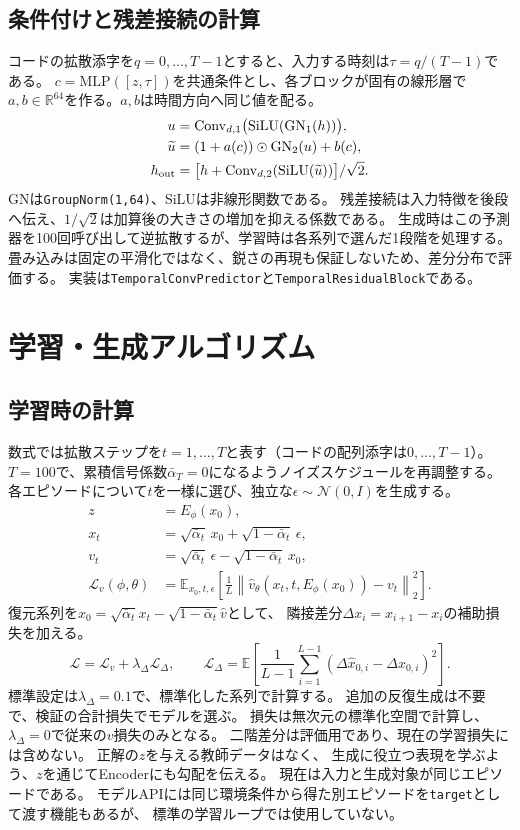 \documentclass[a4paper,10pt]{article}
\begin{document}
\subsection{条件付けと残差接続の計算}
コードの拡散添字を$q=0,\ldots,T-1$とすると、入力する時刻は$\tau=q/(T-1)$である。
$c=\mathrm{MLP}([z,\tau])$を共通条件とし、各ブロックが固有の線形層で
$a,b\in\mathbb R^{64}$を作る。$a,b$は時間方向へ同じ値を配る。
\begin{align*}
 u&=\mathrm{Conv}_{d,1}\bigl(\mathrm{SiLU}(\mathrm{GN}_1(h))\bigr),\\
 \widetilde u&=(1+a(c))\odot\mathrm{GN}_2(u)+b(c),\\
 h_{\rm out}&=\bigl[h+\mathrm{Conv}_{d,2}(\mathrm{SiLU}(\widetilde u))\bigr]/\sqrt{2}.
\end{align*}
GNは\texttt{GroupNorm(1,64)}、SiLUは非線形関数である。
残差接続は入力特徴を後段へ伝え、$1/\sqrt2$は加算後の大きさの増加を抑える係数である。
生成時はこの予測器を100回呼び出して逆拡散するが、学習時は各系列で選んだ1段階を処理する。
畳み込みは固定の平滑化ではなく、鋭さの再現も保証しないため、差分分布で評価する。
実装は\texttt{TemporalConvPredictor}と\texttt{TemporalResidualBlock}である。

\newpage
\section{学習・生成アルゴリズム}
\subsection{学習時の計算}
数式では拡散ステップを$t=1,\ldots,T$と表す（コードの配列添字は$0,\ldots,T-1$）。
$T=100$で、累積信号係数$\bar\alpha_T=0$になるようノイズスケジュールを再調整する。
各エピソードについて$t$を一様に選び、独立な$\epsilon\sim\mathcal{N}(0,I)$を生成する。
\begin{align}
 z&=E_\phi(x_0),\\
 x_t&=\sqrt{\bar\alpha_t}\,x_0+\sqrt{1-\bar\alpha_t}\,\epsilon,\\
 v_t&=\sqrt{\bar\alpha_t}\,\epsilon-\sqrt{1-\bar\alpha_t}\,x_0,\\
 \mathcal{L}_v(\phi,\theta)&=
 \mathbb{E}_{x_0,t,\epsilon}\!\left[
 \frac1L\left\|\hat v_\theta(x_t,t,E_\phi(x_0))-v_t\right\|_2^2\right].
\end{align}
復元系列を$\hat x_0=\sqrt{\bar\alpha_t}x_t-\sqrt{1-\bar\alpha_t}\hat v$として、
隣接差分$\Delta x_i=x_{i+1}-x_i$の補助損失を加える。
\[
\mathcal L=\mathcal L_v+\lambda_\Delta\mathcal L_\Delta,\qquad
\mathcal L_\Delta=\mathbb E\left[\frac{1}{L-1}\sum_{i=1}^{L-1}(\Delta\hat x_{0,i}-\Delta x_{0,i})^2\right].
\]
標準設定は$\lambda_\Delta=0.1$で、標準化した系列で計算する。
追加の反復生成は不要で、検証の合計損失でモデルを選ぶ。
損失は無次元の標準化空間で計算し、$\lambda_\Delta=0$で従来の$v$損失のみとなる。
二階差分は評価用であり、現在の学習損失には含めない。
正解の$z$を与える教師データはなく、
生成に役立つ表現を学ぶよう、$z$を通じてEncoderにも勾配を伝える。
現在は入力と生成対象が同じエピソードである。
モデルAPIには同じ環境条件から得た別エピソードを\texttt{target}として渡す機能もあるが、
標準の学習ループでは使用していない。
\end{document}
